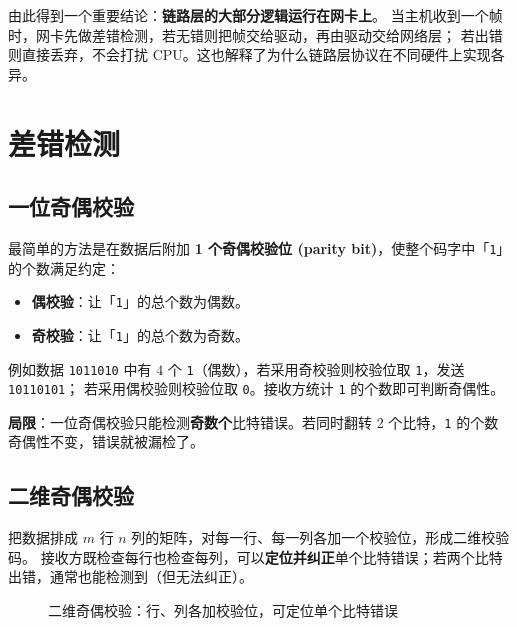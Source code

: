 由此得到一个重要结论：\textbf{链路层的大部分逻辑运行在网卡上}。
当主机收到一个帧时，网卡先做差错检测，若无错则把帧交给驱动，再由驱动交给网络层；
若出错则直接丢弃，不会打扰 CPU。这也解释了为什么链路层协议在不同硬件上实现各异。

\section{差错检测}

\subsection{一位奇偶校验}

最简单的方法是在数据后附加 \textbf{1 个奇偶校验位 (parity bit)}，使整个码字中「\texttt{1}」的个数满足约定：

\begin{itemize}
    \item \textbf{偶校验}：让「\texttt{1}」的总个数为偶数。
    \item \textbf{奇校验}：让「\texttt{1}」的总个数为奇数。
\end{itemize}

例如数据 \texttt{1011010} 中有 $4$ 个 \texttt{1}（偶数），若采用奇校验则校验位取 \texttt{1}，发送 \texttt{10110101}；
若采用偶校验则校验位取 \texttt{0}。接收方统计 \texttt{1} 的个数即可判断奇偶性。

\textbf{局限}：一位奇偶校验只能检测\textbf{奇数个}比特错误。若同时翻转 2 个比特，\texttt{1} 的个数奇偶性不变，错误就被漏检了。

\subsection{二维奇偶校验}

把数据排成 $m$ 行 $n$ 列的矩阵，对每一行、每一列各加一个校验位，形成二维校验码。
接收方既检查每行也检查每列，可以\textbf{定位并纠正}单个比特错误；若两个比特出错，通常也能检测到（但无法纠正）。

\begin{figure}[H]
\centering
{}
\caption{二维奇偶校验：行、列各加校验位，可定位单个比特错误}
\label{fig:2d_parity}
\end{figure}


